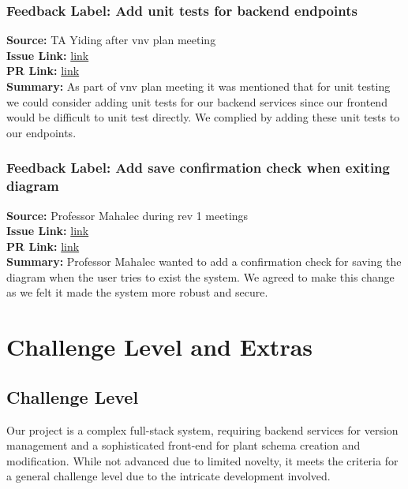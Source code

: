 \documentclass{article}
\begin{document}
    \subsubsection*{Feedback Label: Add unit tests for backend endpoints}
    \textbf{Source:} TA Yiding after vnv plan meeting\\
    \textbf{Issue Link:} \href{https://github.com/MadhuranS/capstone/issues/395}{link} \\
    \textbf{PR Link:} \href{https://github.com/MadhuranS/capstone/pull/329}{link} \\
    \textbf{Summary:} As part of vnv plan meeting it was mentioned that for unit testing we could consider adding unit tests for our backend services since our frontend would be difficult to unit test directly. We complied by adding these unit tests to our endpoints. 
    
    \subsubsection*{Feedback Label: Add save confirmation check when exiting diagram}
    \textbf{Source:} Professor Mahalec during rev 1 meetings\\
    \textbf{Issue Link:} \href{https://github.com/MadhuranS/capstone/issues/292}{link} \\
    \textbf{PR Link:} \href{https://github.com/MadhuranS/capstone/pull/303}{link} \\
    \textbf{Summary:} Professor Mahalec wanted to add a confirmation check for saving the diagram when the user tries to exist the system. We agreed to make this change as we felt it made the system more robust and secure. 



\section{Challenge Level and Extras}

\subsection{Challenge Level}

Our project is a complex full-stack system, requiring backend services for version management and a sophisticated front-end for plant schema creation and modification. While not advanced due to limited novelty, it meets the criteria for a general challenge level due to the intricate development involved.
\end{document}
